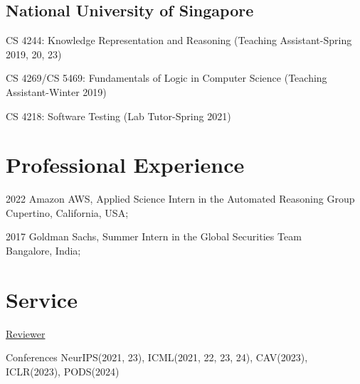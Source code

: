 \documentclass[12pt,letterpaper]{report}
\newcommand{\listitemspace}{0.15em}
\renewenvironment{itemize}
{\begin{list}{}{\setlength{\leftmargin}{0em}
			\setlength{\parskip}{0em}
			\setlength{\itemsep}{\listitemspace}
			\setlength{\parsep}{\listitemspace}}}
	{\end{list}}
\begin{document}
	\subsection*{National University of Singapore}
	
	\begin{itemize}
		
		\item   CS 4244: Knowledge Representation and Reasoning (Teaching Assistant-Spring 2019, 20, 23)
		\item   CS 4269/CS 5469: Fundamentals of Logic in Computer Science (Teaching Assistant-Winter 2019)
		\item   CS 4218: Software Testing (Lab Tutor-Spring 2021)
		
	\end{itemize}
	
	\section*{Professional Experience}
	\begin{tablist}
		\item[2022] \tab Amazon AWS, Applied Science Intern in the Automated Reasoning Group\\
		Cupertino, California, USA;
	\end{tablist}
	\begin{tablist}
		\item[2017] \tab Goldman Sachs, Summer Intern in the Global Securities Team\\
		Bangalore, India;
	\end{tablist}
	
	
	
	\section*{Service}
	\underline{Reviewer }
	\begin{tablist}
		\item[Conferences] \tab NeurIPS(2021, 23), ICML(2021, 22, 23, 24), CAV(2023), ICLR(2023), PODS(2024)
	\end{tablist}
	
\end{document}
